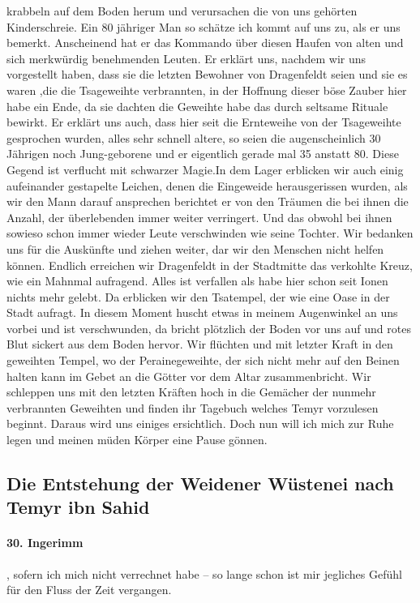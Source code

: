 krabbeln auf dem Boden herum und verursachen die von uns gehörten Kinderschreie. Ein 80 jähriger Man so schätze ich kommt auf uns zu, als er uns bemerkt. Anscheinend hat er das Kommando über diesen Haufen von alten und sich merkwürdig benehmenden Leuten. Er erklärt uns, nachdem wir uns vorgestellt haben, dass sie die letzten Bewohner von Dragenfeldt   seien und sie es waren ,die die Tsageweihte verbrannten, in der Hoffnung dieser böse Zauber hier habe ein Ende, da sie dachten die Geweihte habe das durch seltsame Rituale bewirkt. Er erklärt uns auch, dass hier seit die Ernteweihe von der Tsageweihte gesprochen wurden, alles sehr schnell altere, so seien die augenscheinlich 30 Jährigen noch Jung-geborene und er eigentlich gerade mal 35 anstatt 80. Diese Gegend ist verflucht mit schwarzer Magie.In dem Lager erblicken wir auch einig aufeinander gestapelte Leichen, denen die Eingeweide herausgerissen wurden, als wir den Mann darauf ansprechen berichtet er von den Träumen die bei ihnen die Anzahl, der überlebenden immer weiter verringert. Und das obwohl bei ihnen sowieso schon immer wieder Leute verschwinden wie seine Tochter. Wir bedanken uns für die Auskünfte und ziehen weiter, dar wir den Menschen nicht helfen können. Endlich erreichen wir Dragenfeldt  in der Stadtmitte das verkohlte Kreuz, wie ein Mahnmal aufragend. Alles ist verfallen als habe hier schon seit Ionen nichts mehr gelebt. Da erblicken wir den Tsatempel, der wie eine Oase in der Stadt aufragt. In diesem Moment huscht etwas in meinem Augenwinkel an uns vorbei und ist verschwunden, da bricht plötzlich der Boden vor uns auf und rotes Blut sickert aus dem Boden hervor. Wir flüchten und mit letzter Kraft in den geweihten Tempel, wo der Perainegeweihte, der sich nicht mehr auf den Beinen halten kann im Gebet an die Götter vor dem Altar zusammenbricht. Wir schleppen uns mit den letzten Kräften hoch in die Gemächer der nunmehr verbrannten Geweihten und finden ihr Tagebuch welches Temyr vorzulesen beginnt. Daraus wird uns einiges ersichtlich. Doch nun will ich mich zur Ruhe legen und meinen müden Körper eine Pause gönnen.\par

\subsection{Die Entstehung der Weidener Wüstenei nach Temyr ibn Sahid}

\paragraph{30. Ingerimm}, sofern ich mich nicht verrechnet habe -- so lange schon ist mir jegliches Gefühl für den Fluss der Zeit vergangen.\par

